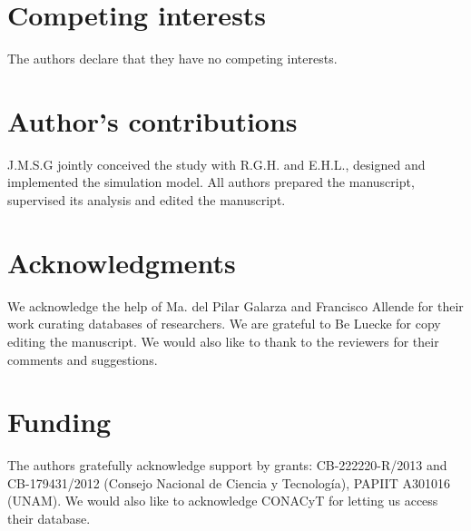 \documentclass{bmcart}
\begin{document}
\begin{backmatter}

\section*{Competing interests}
  The authors declare that they have no competing interests.

\section*{Author's contributions}
    J.M.S.G jointly conceived the study with  R.G.H. and E.H.L., designed and
    implemented the simulation model. All authors prepared the manuscript,
    supervised its analysis and edited the manuscript. 

\section*{Acknowledgments}

We acknowledge the help of Ma. del Pilar Galarza and Francisco Allende
for their work curating databases of researchers. We are grateful to
Be Luecke for copy editing the manuscript. We would also like to thank to the
reviewers for their comments and suggestions.

\section*{Funding}
  The authors gratefully acknowledge support by grants: CB-222220-R/2013 and
CB-179431/2012 (Consejo Nacional de Ciencia y Tecnolog\'ia), PAPIIT A301016 (UNAM). We would also like
to acknowledge CONACyT for letting us access their database.


\end{backmatter}
\end{document}
